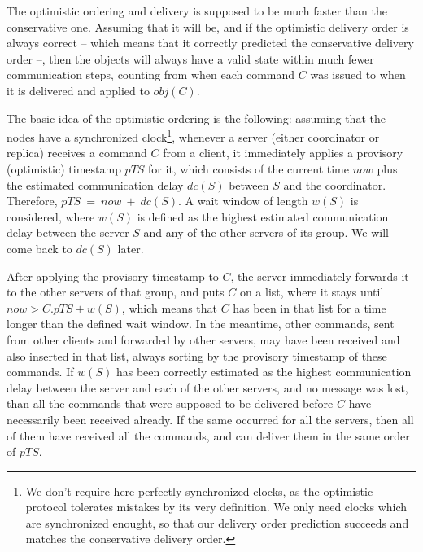 \documentclass[times, 10pt]{article}
\begin{document}
The optimistic ordering and delivery is supposed to be much faster than the conservative one. Assuming that it will be, and if the optimistic delivery order is always correct -- which means that it correctly predicted the conservative delivery order --, then the objects will always have a valid state within much fewer communication steps, counting from when each command $C$ was issued to when it is delivered and applied to $obj(C)$.

The basic idea of the optimistic ordering is the following: assuming that the nodes have a synchronized clock\footnote{We don't require here perfectly synchronized clocks, as the optimistic protocol tolerates mistakes by its very definition. We only need clocks which are synchronized enought, so that our delivery order prediction succeeds and matches the conservative delivery order.}, whenever a server (either coordinator or replica) receives a command $C$ from a client, it immediately applies a provisory (optimistic) timestamp $pTS$ for it, which consists of the current time $now$ plus the estimated communication delay $dc(S)$ between $S$ and the coordinator. Therefore, $pTS~=~now~+~dc(S)$. A wait window of length $w(S)$ is considered, where $w(S)$ is defined as the highest estimated communication delay between the server $S$ and any of the other servers of its group. We will come back to $dc(S)$ later.

After applying the provisory timestamp to $C$, the server immediately forwards it to the other servers of that group, and puts $C$ on a list, where it stays until $now > C.pTS + w(S)$, which means that $C$ has been in that list for a time longer than the defined wait window. In the meantime, other commands, sent from other clients and forwarded by other servers, may have been received and also inserted in that list, always sorting by the provisory timestamp of these commands. If $w(S)$ has been correctly estimated as the highest communication delay between the server and each of the other servers, and no message was lost, than all the commands that were supposed to be delivered before $C$ have necessarily been received already. If the same occurred for all the servers, then all of them have received all the commands, and can deliver them in the same order of $pTS$.
\end{document}
